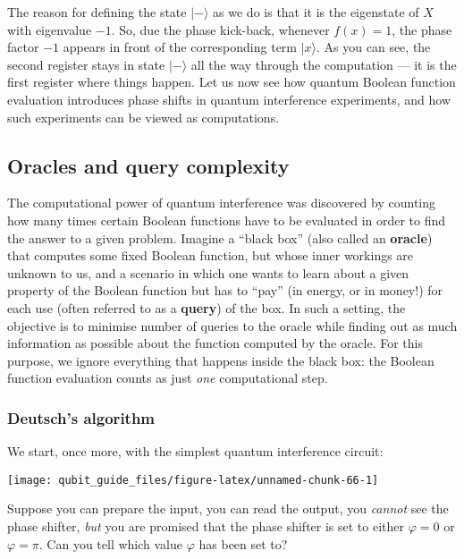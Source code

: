\documentclass[fleqn]{article}
\begin{document}
The reason for defining the state \(|-\rangle\) as we do is that it is the eigenstate of \(X\) with eigenvalue \(-1\).
So, due the phase kick-back, whenever \(f(x)=1\), the phase factor \(-1\) appears in front of the corresponding term \(|x\rangle\).
As you can see, the second register stays in state \(|-\rangle\) all the way through the computation --- it is the first register where things happen.
Let us now see how quantum Boolean function evaluation introduces phase shifts in quantum interference experiments, and how such experiments can be viewed as computations.

\hypertarget{oracles-and-query-complexity}{%
\subsection{Oracles and query complexity}\label{oracles-and-query-complexity}}

The computational power of quantum interference was discovered by counting how many times certain Boolean functions have to be evaluated in order to find the answer to a given problem.
Imagine a ``black box'' (also called an \textbf{oracle}) that computes some fixed Boolean function, but whose inner workings are unknown to us, and a scenario in which one wants to learn about a given property of the Boolean function but has to ``pay'' (in energy, or in money!) for each use (often referred to as a \textbf{query}) of the box.
In such a setting, the objective is to minimise number of queries to the oracle while finding out as much information as possible about the function computed by the oracle.
For this purpose, we ignore everything that happens inside the black box: the Boolean function evaluation counts as just \emph{one} computational step.

\hypertarget{deutschs-algorithm}{%
\subsubsection{Deutsch's algorithm}\label{deutschs-algorithm}}

We start, once more, with the simplest quantum interference circuit:

\begin{center}\texttt{[image: qubit\_guide\_files/figure-latex/unnamed-chunk-66-1]} \end{center}

Suppose you can prepare the input, you can read the output, you \emph{cannot} see the phase shifter, \emph{but} you are promised that the phase shifter is set to either \(\varphi=0\) or \(\varphi=\pi\).
Can you tell which value \(\varphi\) has been set to?
\end{document}
